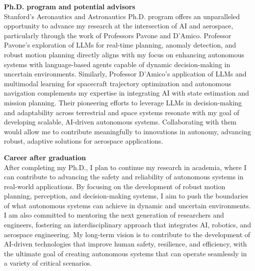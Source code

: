 \documentclass[a4,20pt]{article}
\begin{document}
\begin{large}
\textbf{Ph.D. program and potential advisors} \\
Stanford’s Aeronautics and Astronautics Ph.D. program offers an unparalleled opportunity to advance my research at the intersection of AI and aerospace, particularly through the work of Professors Pavone and D’Amico. Professor Pavone’s exploration of LLMs for real-time planning, anomaly detection, and robust motion planning directly aligns with my focus on enhancing autonomous systems with language-based agents capable of dynamic decision-making in uncertain environments. Similarly, Professor D’Amico’s application of LLMs and multimodal learning for spacecraft trajectory optimization and autonomous navigation complements my expertise in integrating AI with state estimation and mission planning. Their pioneering efforts to leverage LLMs in decision-making and adaptability across terrestrial and space systems resonate with my goal of developing scalable, AI-driven autonomous systems. Collaborating with them would allow me to contribute meaningfully to innovations in autonomy, advancing robust, adaptive solutions for aerospace applications.



\textbf{Career after graduation}\\
After completing my Ph.D., I plan to continue my research in academia, where I can contribute to advancing the safety and reliability of autonomous systems in real-world applications. By focusing on the development of robust motion planning, perception, and decision-making systems, I aim to push the boundaries of what autonomous systems can achieve in dynamic and uncertain environments. I am also committed to mentoring the next generation of researchers and engineers, fostering an interdisciplinary approach that integrates AI, robotics, and aerospace engineering. My long-term vision is to contribute to the development of AI-driven technologies that improve human safety, resilience, and efficiency, with the ultimate goal of creating autonomous systems that can operate seamlessly in a variety of critical scenarios.


\end{large}
\end{document}
